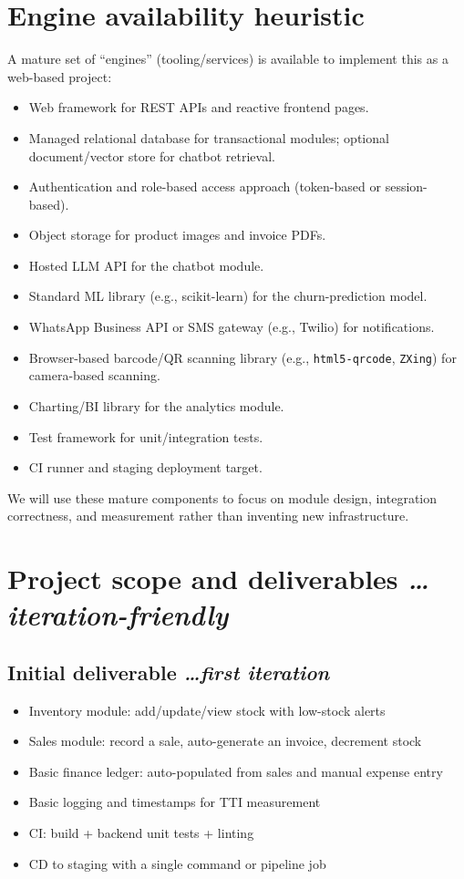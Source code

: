 \documentclass[11pt,a4paper]{article}
\newcommand{\BvrHint}[1]{%
  {\normalfont\normalsize\itshape\hfill #1}}
\begin{document}
\section{Engine availability heuristic}
A mature set of ``engines'' (tooling/services) is available to implement this as a web-based project:
\begin{itemize}[leftmargin=0.7cm]
    \item Web framework for REST APIs and reactive frontend pages.
    \item Managed relational database for transactional modules; optional document/vector store for chatbot retrieval.
    \item Authentication and role-based access approach (token-based or session-based).
    \item Object storage for product images and invoice PDFs.
    \item Hosted LLM API for the chatbot module.
    \item Standard ML library (e.g., scikit-learn) for the churn-prediction model.
    \item WhatsApp Business API or SMS gateway (e.g., Twilio) for notifications.
    \item Browser-based barcode/QR scanning library (e.g., \texttt{html5-qrcode}, \texttt{ZXing}) for camera-based scanning.
    \item Charting/BI library for the analytics module.
    \item Test framework for unit/integration tests.
    \item CI runner and staging deployment target.
\end{itemize}
We will use these mature components to focus on module design, integration correctness, and measurement rather than inventing new infrastructure.

\section{Project scope and deliverables %
\BvrHint{\ldots iteration-friendly}}
\subsection{Initial deliverable %
\BvrHint{\ldots first iteration}}
\begin{itemize}[leftmargin=0.7cm]
    \item Inventory module: add/update/view stock with low-stock alerts
    \item Sales module: record a sale, auto-generate an invoice, decrement stock
    \item Basic finance ledger: auto-populated from sales and manual expense entry
    \item Basic logging and timestamps for TTI measurement
    \item CI: build + backend unit tests + linting
    \item CD to staging with a single command or pipeline job
\end{itemize}
\end{document}
